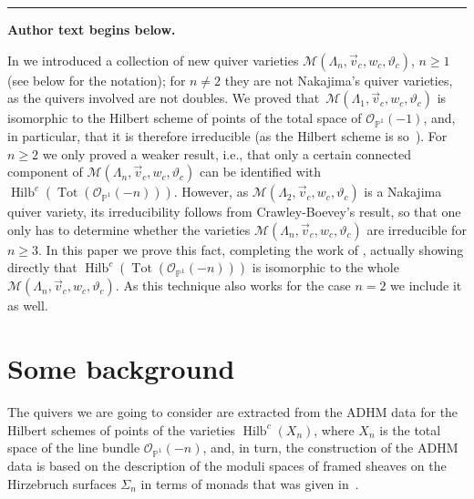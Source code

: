 \documentclass[11pt]{article}
\numberwithin{equation}{section}
\numberwithin{equation}{section}
\begin{document}
\medskip\hrule\medskip\noindent\textbf{Author text begins below.}\par
\setcounter{section}{1}
 In \cite{bblr} we introduced a collection of new quiver varieties $\mathcal{M} (\Lambda_n,\vec{v}_c,w_c, \vartheta_c)$, ${n\geq1}$ (see below for the notation);
 for $n\neq 2$ they are not Nakajima's quiver varieties, as the quivers involved are not doubles. We proved that~$\mathcal{M} (\Lambda_1,\vec{v}_c,w_c, \vartheta_c)$ is isomorphic to the Hilbert scheme of points of the total space of $\mathcal{O}_{\mathbb{P}^1}(-1)$, and, in particular, that it is therefore irreducible (as the Hilbert scheme is so~\cite{Fogarty}). For $n\geq 2$ we only proved a weaker result, i.e.,
 that only a certain connected component of $\mathcal{M} (\Lambda_n,\vec{v}_c,w_c, \vartheta_c)$ can be identified with $\operatorname{Hilb}^c(\operatorname{Tot}(\mathcal{O}_{\mathbb{P}^1}(-n)))$. However, as $\mathcal{M} (\Lambda_2,\vec{v}_c,w_c, \vartheta_c)$ is a Nakajima quiver variety, its irreducibility follows from Crawley-Boevey's result, so that one only has to determine whether the varieties $\mathcal{M} (\Lambda_n,\vec{v}_c,w_c, \vartheta_c)$ are irreducible for $n\geq 3$. In this paper we prove this fact, completing the work of \cite{bblr}, actually showing directly
 that $\operatorname{Hilb}^c(\operatorname{Tot}(\mathcal{O}_{\mathbb{P}^1}(-n)))$ is isomorphic to the whole
$\mathcal{M} (\Lambda_n,\vec{v}_c,w_c, \vartheta_c)$. As this technique also works for the case $n=2$ we include it as well.

\section{Some background } \label{background}
The quivers we are going to consider are extracted from the ADHM data for the Hilbert schemes of points of the varieties $\operatorname{Hilb}^c(X_n)$,
 where $X_n$ is the total space of the line bundle $\mathcal{O}_{\mathbb{P}^1}(-n)$,
and, in turn,
the construction of the ADHM data is based on the description of the moduli spaces of framed sheaves on the Hirzebruch surfaces $\Sigma_n$ in terms of monads that was given in~\cite{bbr}.
\end{document}
